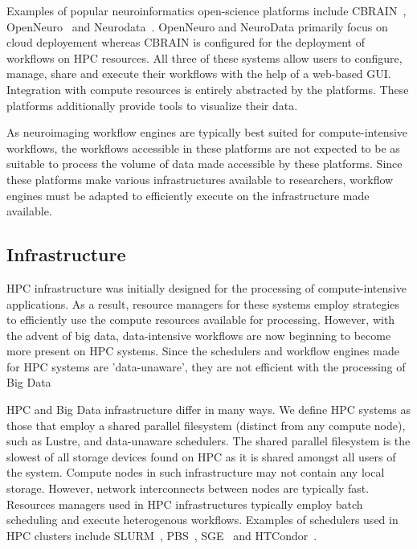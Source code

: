             Examples of popular neuroinformatics open-science platforms include 
            CBRAIN~\cite{10.3389/fninf.2014.00054}, 
            OpenNeuro~\cite{gorgolewski2017openneuro} and 
            Neurodata~\cite{burns2018community}. OpenNeuro and NeuroData primarily focus on
            cloud deployement whereas CBRAIN is configured for the deployment
            of workflows on HPC resources. All three of these systems allow 
            users to configure, manage, share and execute their workflows with 
            the help of a web-based GUI. Integration with compute resources is
            entirely abstracted by the platforms. These platforms additionally
            provide tools to visualize their data.

            As neuroimaging workflow engines are typically best suited for 
            compute-intensive workflows, the workflows accessible in these 
            platforms are not expected to be as suitable to process the 
            volume of data made accessible by these platforms. Since these 
            platforms make various infrastructures available to researchers, 
            workflow engines must be adapted to efficiently execute on the 
            infrastructure made available.
            
        \subsection{Infrastructure}\label{infrastructure}
            HPC infrastructure was initially designed for the processing of 
            compute-intensive applications. As a result,
            resource managers for these systems employ
            strategies to efficiently use the compute resources available for 
            processing. However, with the advent of big data, data-intensive 
            workflows are now beginning to become more present on HPC systems.
            Since the schedulers and workflow engines made for HPC systems are 
            'data-unaware', they are not efficient with the processing of Big
            Data

            HPC and Big Data infrastructure differ in many ways. We define HPC 
            systems as those that employ a shared parallel 
            filesystem (distinct from any compute node), such as Lustre, and 
            data-unaware schedulers.
            The shared parallel filesystem is the slowest of
            all storage devices found on HPC as it is shared amongst all users 
            of the system.
            Compute nodes in such infrastructure may not contain any local 
            storage. However, network interconnects between nodes are typically 
            fast.
            Resources managers used in HPC infrastructures typically employ 
            batch scheduling and execute heterogenous workflows. 
            Examples of schedulers used in HPC clusters 
            include SLURM~\cite{yoo2003slurm}, 
            PBS~\cite{10.1007/3-540-60153-8_34}, SGE~\cite{SGE} and 
            HTCondor~\cite{htcondor}.

